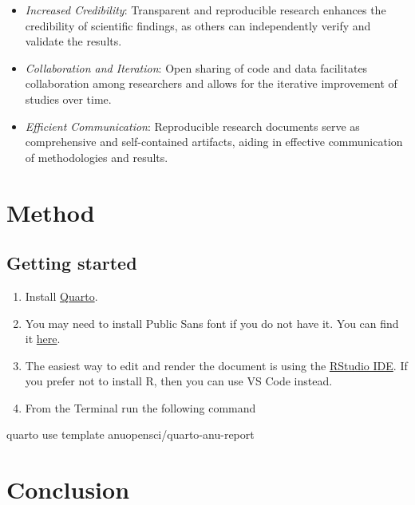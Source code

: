 \documentclass[
  a4paper,
  oneside,
  open=any]{scrbook}
\newenvironment{Shaded}{\begin{snugshade}}{\end{snugshade}}
\newcommand{\ExtensionTok}[1]{\textcolor[rgb]{0.00,0.23,0.31}{#1}}
\newcommand{\NormalTok}[1]{\textcolor[rgb]{0.00,0.23,0.31}{#1}}
\providecommand{\tightlist}{%
  \setlength{\itemsep}{0pt}\setlength{\parskip}{0pt}}
\begin{document}
\begin{itemize}
\tightlist
\item
  \emph{Increased Credibility}: Transparent and reproducible research
  enhances the credibility of scientific findings, as others can
  independently verify and validate the results.
\item
  \emph{Collaboration and Iteration}: Open sharing of code and data
  facilitates collaboration among researchers and allows for the
  iterative improvement of studies over time.
\item
  \emph{Efficient Communication}: Reproducible research documents serve
  as comprehensive and self-contained artifacts, aiding in effective
  communication of methodologies and results.
\end{itemize}

\section{Method}\label{method}

\subsection{Getting started}\label{getting-started}

\begin{enumerate}
\def\labelenumi{\arabic{enumi}.}
\tightlist
\item
  Install \href{https://quarto.org/docs/get-started/}{Quarto}.
\item
  You may need to install Public Sans font if you do not have it. You
  can find it
  \href{https://github.com/anuopensci/quarto-anu-report/tree/main/_extensions/anu-report/assets/webfonts}{here}.
\item
  The easiest way to edit and render the document is using the
  \href{https://posit.co/download/rstudio-desktop/}{RStudio IDE}. If you
  prefer not to install R, then you can use VS Code instead.
\item
  From the Terminal run the following command
\end{enumerate}

\begin{Shaded}
\begin{Highlighting}[]
\ExtensionTok{quarto}\NormalTok{ use template anuopensci/quarto{-}anu{-}report}
\end{Highlighting}
\end{Shaded}

\section{Conclusion}\label{conclusion}
\end{document}
